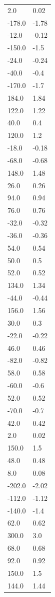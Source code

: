 \begin{longtable}{ll}
2.0 & 0.02 \\
-178.0 & -1.78 \\
-12.0 & -0.12 \\
-150.0 & -1.5 \\
-24.0 & -0.24 \\
-40.0 & -0.4 \\
-170.0 & -1.7 \\
184.0 & 1.84 \\
122.0 & 1.22 \\
40.0 & 0.4 \\
120.0 & 1.2 \\
-18.0 & -0.18 \\
-68.0 & -0.68 \\
148.0 & 1.48 \\
26.0 & 0.26 \\
94.0 & 0.94 \\
76.0 & 0.76 \\
-32.0 & -0.32 \\
-36.0 & -0.36 \\
54.0 & 0.54 \\
50.0 & 0.5 \\
52.0 & 0.52 \\
134.0 & 1.34 \\
-44.0 & -0.44 \\
156.0 & 1.56 \\
30.0 & 0.3 \\
-22.0 & -0.22 \\
46.0 & 0.46 \\
-82.0 & -0.82 \\
58.0 & 0.58 \\
-60.0 & -0.6 \\
52.0 & 0.52 \\
-70.0 & -0.7 \\
42.0 & 0.42 \\
2.0 & 0.02 \\
150.0 & 1.5 \\
48.0 & 0.48 \\
8.0 & 0.08 \\
-202.0 & -2.02 \\
-112.0 & -1.12 \\
-140.0 & -1.4 \\
62.0 & 0.62 \\
300.0 & 3.0 \\
68.0 & 0.68 \\
92.0 & 0.92 \\
150.0 & 1.5 \\
144.0 & 1.44 \\

\end{longtable}
